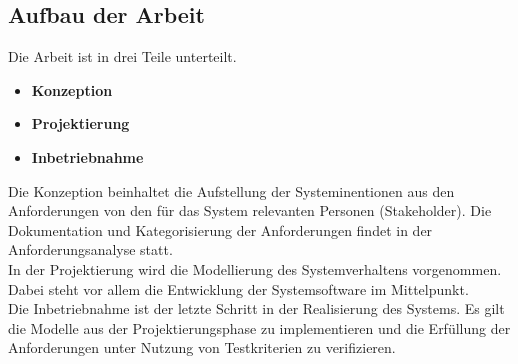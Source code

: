 \documentclass[../../Bachelorarbeit.tex]{subfiles}
\begin{document}

\subsection{Aufbau der Arbeit}
Die Arbeit ist in drei Teile unterteilt.

\begin{itemize}
    \item \textbf{Konzeption}
    \item \textbf{Projektierung}
    \item \textbf{Inbetriebnahme}
\end{itemize}

Die Konzeption beinhaltet die Aufstellung der Systeminentionen aus den Anforderungen von den für das System relevanten Personen (Stakeholder). Die Dokumentation und Kategorisierung der Anforderungen findet in der Anforderungsanalyse statt.\\
In der Projektierung wird die Modellierung des Systemverhaltens vorgenommen. Dabei steht vor allem die Entwicklung der Systemsoftware im Mittelpunkt.\\
Die Inbetriebnahme ist der letzte Schritt in der Realisierung des Systems. Es gilt die Modelle aus der Projektierungsphase zu implementieren und die Erfüllung der Anforderungen unter Nutzung von Testkriterien zu verifizieren.\\
\end{document}
